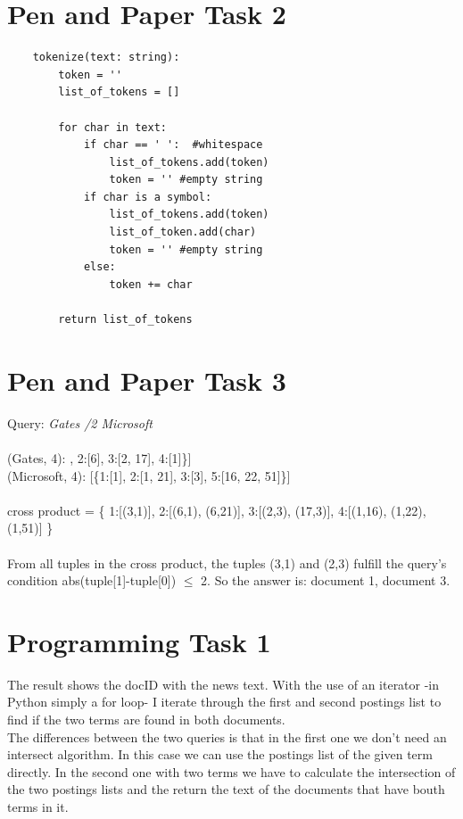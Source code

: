 \documentclass[a4paper]{scrartcl}
\begin{document}
\section*{Pen and Paper Task 2}
\begin{lstlisting}
    tokenize(text: string):
        token = ''
        list_of_tokens = []

        for char in text:
            if char == ' ':  #whitespace
                list_of_tokens.add(token)
                token = '' #empty string
            if char is a symbol:
                list_of_tokens.add(token)
                list_of_token.add(char)
                token = '' #empty string
            else:
                token += char
                
        return list_of_tokens

\end{lstlisting}

\clearpage
\section*{Pen and Paper Task 3}
Query: \textit{Gates /2 Microsoft}\\
\\
(Gates, 4): \quad \; [\{1:[3], 2:[6], 3:[2, 17], 4:[1]\}]\\
(Microsoft, 4): [\{1:[1], 2:[1, 21], 3:[3], 5:[16, 22, 51]\}]\\
\\
cross product = \{
  1:[(3,1)],
  2:[(6,1), (6,21)],
  3:[(2,3), (17,3)],
  4:[(1,16), (1,22), (1,51)]
\}\\
\\
From all tuples in the cross product, the tuples (3,1) and (2,3) fulfill the query's condition abs(tuple[1]-tuple[0]) $\leq$ 2. So the answer is: document 1, document 3.\\


\clearpage
\section*{Programming Task 1}


The result shows the docID with the news text. With the use of an iterator -in Python simply a for loop- I iterate through the first and second postings list to find if the two terms are found in both documents.\\
The differences between the two queries is that in the first one we don't need an intersect algorithm.
In this case we can use the postings list of the given term directly. In the second one with two terms we have to calculate the intersection of the two postings lists and the return the text of the documents that have bouth terms in it.
\end{document}
